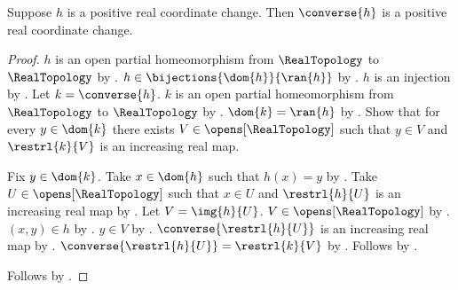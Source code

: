 \begin{theorem}\label{positive_real_change_converse}
    Suppose $h$ is a positive real coordinate change.
    Then $\converse{h}$ is a positive real coordinate change.
\end{theorem}
\begin{proof}
    $h$ is an open partial homeomorphism from $\RealTopology$ to $\RealTopology$
        by .
    $h\in\bijections{\dom{h}}{\ran{h}}$ by
        .
    $h$ is an injection by .
    Let $k=\converse{h}$.
    $k$ is an open partial homeomorphism from $\RealTopology$ to $\RealTopology$ by
        .
    $\dom{k}=\ran{h}$ by .
    Show that for every $y\in\dom{k}$ there exists $V\in\opens[\RealTopology]$
        such that $y\in V$ and $\restrl{k}{V}$ is an increasing real map.
    \begin{subproof}
        Fix $y\in\dom{k}$.
        Take $x\in\dom{h}$ such that $h(x)=y$ by .
        Take $U\in\opens[\RealTopology]$ such that $x\in U$ and
            $\restrl{h}{U}$ is an increasing real map by .
        Let $V=\img{h}{U}$.
        $V\in\opens[\RealTopology]$ by .
        $(x,y)\in h$ by .
        $y\in V$ by .
        $\converse{\restrl{h}{U}}$ is an increasing real map by
            .
        $\converse{\restrl{h}{U}}=\restrl{k}{V}$ by .
        Follows by \auto.
    \end{subproof}
    Follows by .
\end{proof}

